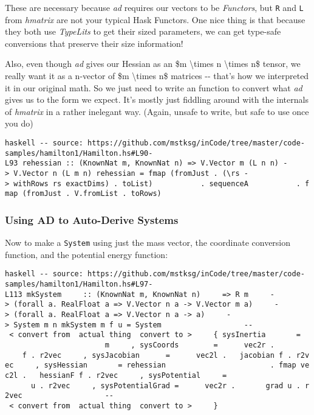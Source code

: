 \documentclass[]{article}
\begin{document}
These are necessary because \emph{ad} requires our vectors to be
\emph{Functors}, but \texttt{R} and \texttt{L} from \emph{hmatrix} are not your
typical Hask Functors. One nice thing is that because they both use
\emph{TypeLits} to get their sized parameters, we can get type-safe conversions
that preserve their size information!

Also, even though \emph{ad} gives our Hessian as an \$m \textbackslash{}times n
\textbackslash{}times n\$ tensor, we really want it as a n-vector of \$m
\textbackslash{}times n\$ matrices -\/- that's how we interpreted it in our
original math. So we just need to write an function to convert what \emph{ad}
gives us to the form we expect. It's mostly just fiddling around with the
internals of \emph{hmatrix} in a rather inelegant way. (Again, unsafe to write,
but safe to use once you do)

\texttt{haskell\ -\/-\ source:\ https://github.com/mstksg/inCode/tree/master/code-samples/hamilton1/Hamilton.hs\#L90-L93\ rehessian\ ::\ (KnownNat\ m,\ KnownNat\ n)\ =\textgreater{}\ V.Vector\ m\ (L\ n\ n)\ -\textgreater{}\ V.Vector\ n\ (L\ m\ n)\ rehessian\ =\ fmap\ (fromJust\ .\ (\textbackslash{}rs\ -\textgreater{}\ withRows\ rs\ exactDims)\ .\ toList)\ \ \ \ \ \ \ \ \ \ \ .\ sequenceA\ \ \ \ \ \ \ \ \ \ \ .\ fmap\ (fromJust\ .\ V.fromList\ .\ toRows)}

\subsubsection{Using AD to Auto-Derive Systems}

Now to make a \texttt{System} using just the mass vector, the coordinate
conversion function, and the potential energy function:

\texttt{haskell\ -\/-\ source:\ https://github.com/mstksg/inCode/tree/master/code-samples/hamilton1/Hamilton.hs\#L97-L113\ mkSystem\ \ \ \ \ ::\ (KnownNat\ m,\ KnownNat\ n)\ \ \ \ \ =\textgreater{}\ R\ m\ \ \ \ \ -\textgreater{}\ (forall\ a.\ RealFloat\ a\ =\textgreater{}\ V.Vector\ n\ a\ -\textgreater{}\ V.Vector\ m\ a)\ \ \ \ \ -\textgreater{}\ (forall\ a.\ RealFloat\ a\ =\textgreater{}\ V.Vector\ n\ a\ -\textgreater{}\ a)\ \ \ \ \ -\textgreater{}\ System\ m\ n\ mkSystem\ m\ f\ u\ =\ System\ \ \ \ \ \ \ \ \ \ \ \ \ \ \ \ \ \ \ -\/-\ \textless{}\ convert\ from\ \textbar{}\ actual\ thing\ \textbar{}\ convert\ to\ \textgreater{}\ \ \ \ \ \{\ sysInertia\ \ \ \ \ \ \ =\ \ \ \ \ \ \ \ \ \ \ \ \ \ \ \ \ \ \ \ \ \ \ \ \ m\ \ \ \ \ ,\ sysCoords\ \ \ \ \ \ \ \ =\ \ \ \ \ \ vec2r\ .\ \ \ \ \ \ \ \ \ \ \ \ f\ .\ r2vec\ \ \ \ \ ,\ sysJacobian\ \ \ \ \ \ =\ \ \ \ \ \ vec2l\ .\ \ \ jacobian\ f\ .\ r2vec\ \ \ \ \ ,\ sysHessian\ \ \ \ \ \ \ =\ rehessian\ \ \ \ \ \ \ \ \ \ \ \ \ \ \ \ \ \ \ \ \ \ \ \ .\ fmap\ vec2l\ .\ \ \ hessianF\ f\ .\ r2vec\ \ \ \ \ ,\ sysPotential\ \ \ \ \ =\ \ \ \ \ \ \ \ \ \ \ \ \ \ \ \ \ \ \ \ \ \ \ \ \ u\ .\ r2vec\ \ \ \ \ ,\ sysPotentialGrad\ =\ \ \ \ \ \ vec2r\ .\ \ \ \ \ \ \ grad\ u\ .\ r2vec\ \ \ \ \ \ \ \ \ \ \ \ \ \ \ \ \ \ \ -\/-\ \textless{}\ convert\ from\ \textbar{}\ actual\ thing\ \textbar{}\ convert\ to\ \textgreater{}\ \ \ \ \ \}}
\end{document}

